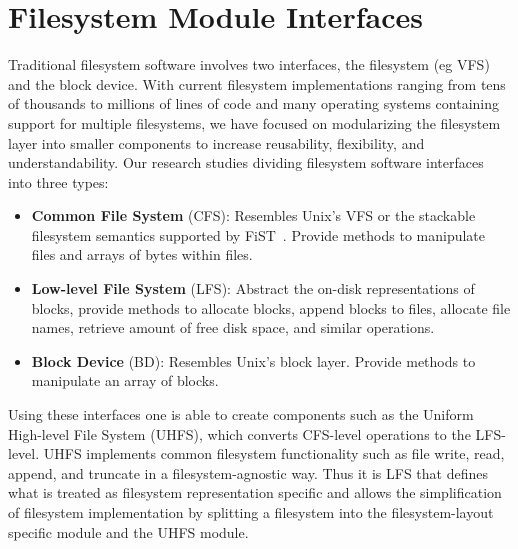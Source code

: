 \section{Filesystem Module Interfaces}
\label{sec:interfaces}

Traditional filesystem software involves two interfaces, the
filesystem (eg VFS) and the block device. With current filesystem
implementations ranging from tens of thousands to millions of lines of
code and many operating systems containing support for multiple
filesystems, we have focused on modularizing the filesystem layer into
smaller components to increase reusability, flexibility, and
understandability. Our research studies dividing filesystem software
interfaces into three types:

\begin{itemize}
\item \itemvspace{} {\bf Common File System} (CFS): Resembles Unix's
  VFS or the stackable filesystem semantics supported by
  FiST~\cite{zadok00fist}. Provide methods to manipulate files and
  arrays of bytes within files.
\item \itemvspace{} {\bf Low-level File System} (LFS): Abstract the
  on-disk representations of blocks, provide methods to allocate
  blocks, append blocks to files, allocate file names, retrieve amount
  of free disk space, and similar operations.
\item \itemvspace{} {\bf Block Device} (BD): Resembles Unix's block
  layer. Provide methods to manipulate an array of blocks.
\end{itemize}
\postlistspacing{}

Using these interfaces one is able to create components such as the
Uniform High-level File System (UHFS), which converts CFS-level
operations to the LFS-level. UHFS implements common filesystem
functionality such as file write, read, append, and truncate in a
filesystem-agnostic way. Thus it is LFS that defines what is treated
as filesystem representation specific and allows the simplification of
filesystem implementation by splitting a filesystem into the
filesystem-layout specific module and the UHFS module.
